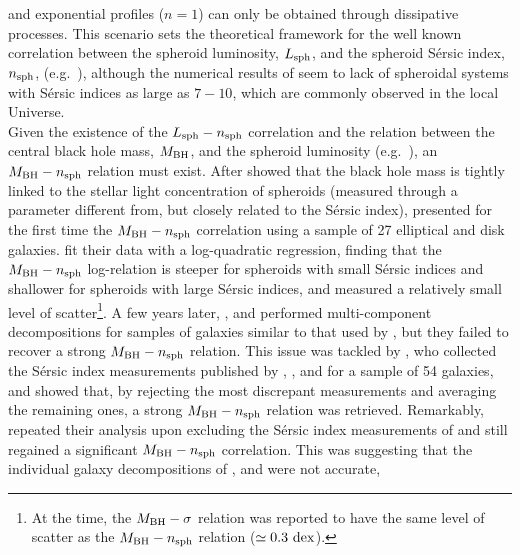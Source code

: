 \documentclass[preprint2]{emulateapj}
\begin{document}
and exponential profiles ($n=1$) can only be obtained through dissipative processes.
This scenario sets the theoretical framework for the well known correlation between the spheroid luminosity, $L_{\rm sph}$,  
and the spheroid S\'ersic index, $n_{\rm sph}$, (e.g.~\citealt{youngcurrie1994,jerjen2000,grahamguzman2003}), 
although the numerical results of \cite{nipoti2015} seem to lack of spheroidal systems with S\'ersic indices as large as $7 - 10$, 
which are commonly observed in the local Universe.  \\
Given the existence of the $L_{\rm sph} - n_{\rm sph}$ correlation 
and the relation between the central black hole mass, $M_{\rm BH}$, and the spheroid luminosity 
(e.g.~\citealt{kormendyrichstone1995,magorrian1998,marconihunt2003,haringrix2004}), 
an $M_{\rm BH} - n_{\rm sph}$ relation must exist. 
After \cite{graham2001bulges} showed that the black hole mass is tightly linked to the stellar light concentration of spheroids 
(measured through a parameter different from, but closely related to the S\'ersic index), 
\cite{grahamdriver2007} presented for the first time the $M_{\rm BH} - n_{\rm sph}$ correlation 
using a sample of 27 elliptical and disk galaxies. 
\cite{grahamdriver2007} fit their data with a log-quadratic regression, 
finding that the $M_{\rm BH} - n_{\rm sph}$ log-relation is steeper for spheroids with small S\'ersic indices 
and shallower for spheroids with large S\'ersic indices, 
and measured a relatively small level of scatter\footnote{At the time, the $M_{\rm BH} - \sigma$ relation 
\citep{ferraresemerritt2000,gebhardt2000} was reported to have the same level of scatter as the $M_{\rm BH} - n_{\rm sph}$ 
relation ($\simeq 0.3~\rm dex$). }.
A few years later, \cite{sani2011}, \cite{vika2012} and \cite{beifiori2012} performed multi-component decompositions 
for samples of galaxies similar to that used by \cite{grahamdriver2007}, 
but they failed to recover a strong $M_{\rm BH} - n_{\rm sph}$ relation. 
This issue was tackled by \cite{savorgnan2013}, who collected the S\'ersic index measurements published by 
\cite{grahamdriver2007}, \cite{sani2011}, \cite{vika2012} and \cite{beifiori2012} for a sample of 54 galaxies, 
and showed that, by rejecting the most discrepant measurements and averaging the remaining ones, 
a strong $M_{\rm BH} - n_{\rm sph}$ relation was retrieved. 
Remarkably, \cite{savorgnan2013} repeated their analysis upon excluding the S\'ersic index measurements of \cite{grahamdriver2007} 
and still regained a significant $M_{\rm BH} - n_{\rm sph}$ correlation. 
This was suggesting that the individual galaxy decompositions of \cite{sani2011}, \cite{vika2012} and \cite{beifiori2012} were not accurate, 
\end{document}

